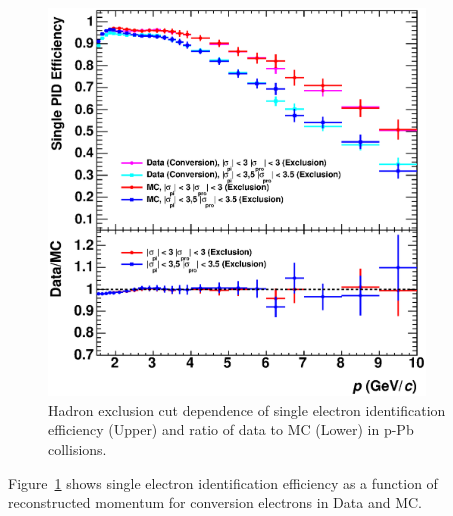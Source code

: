 {\begin{figure}[!h]
  \begin{center}
    \includegraphics[width=10cm]{chap4/figure/PID/SinglePIDEfficinecy_DatatoMC_LHC13b2efix.eps}
  \end{center}
  \caption{Hadron exclusion cut dependence of single electron identification efficiency (Upper) and ratio of data to MC (Lower) in p-Pb collisions.}
  \label{fig_4_singleeff}
\end{figure}
Figure~\ref{fig_4_singleeff} shows single electron identification efficiency as a function of reconstructed momentum for conversion electrons in Data and MC. 

}
